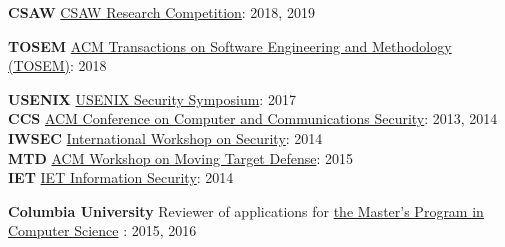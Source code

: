 

\begin{cvparagraph}
    \textbf{CSAW}  \hspace*{1pt} \href{https://csaw.engineering.nyu.edu/}{CSAW Research Competition}: 2018, 2019
\end{cvparagraph}


\begin{cvparagraph}
    \textbf{TOSEM} \hspace*{1pt} \href{https://tosem.acm.org/} {ACM Transactions on Software Engineering and Methodology (TOSEM)}: 2018
\end{cvparagraph}


\begin{cvparagraph}
    \textbf{USENIX} \hspace*{1pt} \href{https://www.usenix.org/conference/usenixsecurity17} {USENIX Security Symposium}: 2017\\
    \textbf{CCS} \hspace*{17pt} \href{https://www.sigsac.org/ccs/CCS2014/}
        {ACM Conference on Computer and Communications Security}: 2013, 2014\\
    \textbf{IWSEC} \hspace*{6pt} \href{http://www.iwsec.org/2014/}{International Workshop on Security}: 2014 \\
    \textbf{MTD} \hspace*{15pt}
    \href{http://mtd.mobicloud.asu.edu/}{ACM Workshop on Moving Target Defense}: 2015\\
    \textbf{IET} \hspace*{20pt}
    \href{http://digital-library.theiet.org/content/journals/iet-ifs}{IET Information Security}: 2014
\end{cvparagraph}


\begin{cvparagraph}
    \textbf{Columbia University} \hspace*{10pt} Reviewer of applications for \href{http://www.cs.columbia.edu/education/ms/}{the Master's Program in Computer Science} \hspace*{1pt}: 2015, 2016
\end{cvparagraph}
